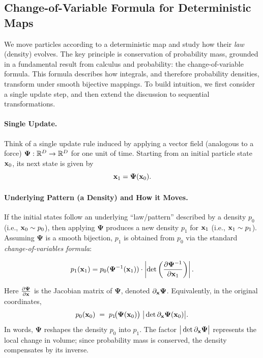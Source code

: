 \subsection{Change-of-Variable Formula for Deterministic Maps}\label{subsec:cov-det}
We move particles according to a deterministic map and study how their \emph{law} (density) evolves. The key principle is conservation of probability mass, grounded in a fundamental result from calculus and probability: the change-of-variable formula. This formula describes how integrals, and therefore probability densities, transform under smooth bijective mappings. To build intuition, we first consider a single update step, and then extend the discussion to sequential transformations.


\paragraph{Single Update.}
Think of a single  update rule induced by applying a vector field (analogous to a force) 
$\bm{\Psi}:\mathbb{R}^D \to \mathbb{R}^D$ for one unit of time. 
Starting from an initial particle state ${\mathbf{x}}_0$, its next state is given by
\[
{\mathbf{x}}_1 = \bm{\Psi}({\mathbf{x}}_0).
\]

\paragraph{Underlying Pattern (a Density) and How it Moves.}
If the initial states follow an underlying ``law/pattern'' described by a density $p_0$ (i.e., ${\mathbf{x}}_0\sim p_0$),
then applying $\bm{\Psi}$ produces a new density $p_1$ for ${\mathbf{x}}_1$ (i.e., ${\mathbf{x}}_1\sim p_1$).
Assuming $\bm{\Psi}$ is a smooth bijection, $p_1$ is obtained from $p_0$ via the standard \emph{change-of-variables formula}:
\begin{mdframed}
\begin{equation}\label{eq:change-of-variable-density}
p_{1}({\mathbf{x}}_1) = p_{0}(\bm{\Psi}^{-1}({\mathbf{x}}_1)) \cdot \left| \det \left( \frac{\partial \bm{\Psi}^{-1}}{\partial {\mathbf{x}}_1} \right) \right|.
\end{equation}
\end{mdframed}
Here $\tfrac{\partial \bm{\Psi}}{\partial {\mathbf{x}}}$ is the Jacobian matrix of $\bm{\Psi}$, denoted $\partial_{\mathbf{x}} \bm{\Psi}$.  
Equivalently, in the original coordinates,
\[
p_0({\mathbf{x}}_0) \;=\; p_1\!\big(\bm{\Psi}({\mathbf{x}}_0)\big)\;\big|\det \partial_{\mathbf{x}} \bm{\Psi}({\mathbf{x}}_0)\big|.
\]
In words, $\bm{\Psi}$ reshapes the density $p_0$ into $p_1$. The factor $\big|\det \partial_{\mathbf{x}} \bm{\Psi}\big|$ represents the local change in volume; since probability mass is conserved, the density compensates by its inverse.  

